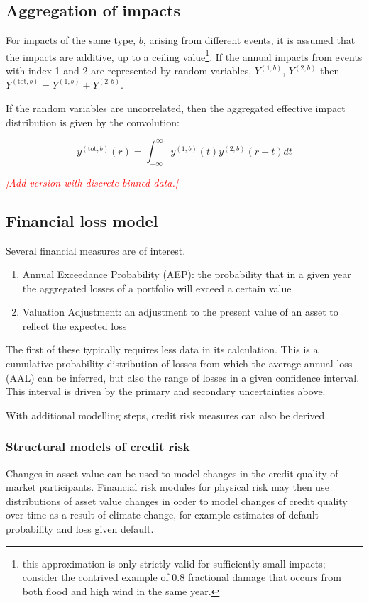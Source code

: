 \documentclass[a4paper,11pt]{extarticle} %
\begin{document}
\subsection{Aggregation of impacts}
For impacts of the same type, $b$, arising from different events, it is assumed that the impacts are additive, up to a ceiling value\footnote{this approximation is only strictly valid for sufficiently small impacts; consider the contrived example of 0.8 fractional damage that occurs from both flood and high wind in the same year.}. If the annual impacts from events with index 1 and 2 are represented by random variables, $Y^{(1,b)}$, $Y^{(2,b)}$ then $Y^{(\text{tot}, b)} = Y^{(1,b)} + Y^{(2,b)}$.

If the random variables are uncorrelated, then the aggregated effective impact distribution is given by the convolution:

\begin{equation}
    \label{Eq:sampling}
    y^{(\text{tot}, b)}(r) = \int^{\infty}_{-\infty} y^{(1, b)}(t) y^{(2, b)}(r - t) dt
\end{equation}

{\textcolor{red}{\emph{[Add version with discrete binned data.]}}}

\subsection{Financial loss model}
Several financial measures are of interest.

\begin{enumerate}
    \item Annual Exceedance Probability (AEP): the probability that in a given year the aggregated losses of a portfolio will exceed a certain value
    \item Valuation Adjustment: an adjustment to the present value of an asset to reflect the expected loss
\end{enumerate}

The first of these typically requires less data in its calculation. This is a cumulative probability distribution of losses from which the average annual loss (AAL) can be inferred, but also the range of losses in a given confidence interval. This interval is driven by the primary and secondary uncertainties above.

With additional modelling steps, credit risk measures can also be derived.

\subsubsection{Structural models of credit risk}
Changes in asset value can be used to model changes in the credit quality of market participants. Financial risk modules for physical risk may then use distributions of asset value changes in order to model changes of credit quality over time as a result of climate change, for example estimates of default probability and loss given default.
\end{document}
